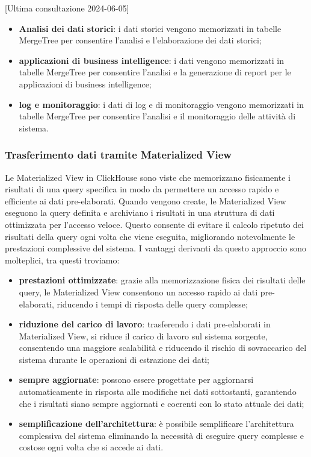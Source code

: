[Ultima consultazione 2024-06-05]

\begin{itemize}
	\item \textbf{Analisi dei dati storici}: i dati storici vengono memorizzati in tabelle MergeTree per consentire l'analisi e l'elaborazione dei dati storici;
	\item \textbf{applicazioni di business intelligence}: i dati vengono memorizzati in tabelle MergeTree per consentire l'analisi e la generazione di report per le applicazioni di business intelligence;
	\item \textbf{log e monitoraggio}: i dati di log e di monitoraggio vengono memorizzati in tabelle MergeTree per consentire l'analisi e il monitoraggio delle attività di sistema.
\end{itemize}


\subsubsection{Trasferimento dati tramite Materialized View}
Le Materialized View in ClickHouse sono viste che memorizzano fisicamente i risultati di una query specifica in modo da permettere un accesso rapido e efficiente ai dati pre-elaborati. Quando vengono create, le Materialized View eseguono la query definita e archiviano i risultati in una struttura di dati ottimizzata per l'accesso veloce. Questo consente di evitare il calcolo ripetuto dei risultati della query ogni volta che viene eseguita, migliorando notevolmente le prestazioni complessive del sistema. I vantaggi derivanti da questo approccio sono molteplici, tra questi troviamo:
\begin{itemize}
	\item \textbf{prestazioni ottimizzate}: grazie alla memorizzazione fisica dei risultati delle query, le Materialized View consentono un accesso rapido ai dati pre-elaborati, riducendo i tempi di risposta delle query complesse;
	\item \textbf{riduzione del carico di lavoro}: trasferendo i dati pre-elaborati in Materialized View, si riduce il carico di lavoro sul sistema sorgente, consentendo una maggiore scalabilità e riducendo il rischio di sovraccarico del sistema durante le operazioni di estrazione dei dati;
	\item \textbf{sempre aggiornate}: possono essere progettate per aggiornarsi automaticamente in risposta alle modifiche nei dati sottostanti, garantendo che i risultati siano sempre aggiornati e coerenti con lo stato attuale dei dati;
	\item \textbf{semplificazione dell'architettura}: è possibile semplificare l'architettura complessiva del sistema eliminando la necessità di eseguire query complesse e costose ogni volta che si accede ai dati.
\end{itemize}
